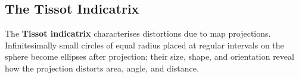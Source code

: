 \subsection{The Tissot Indicatrix}

The \textbf{Tissot indicatrix} characterises
distortions due to map projections. Infinitesimally small circles of equal
radius placed at regular intervals on the sphere become ellipses after
projection; their size, shape, and orientation reveal how the projection
distorts area, angle, and distance.

\renewcommand\bibname{Further reading}
\begin{subappendices}


\end{subappendices}
